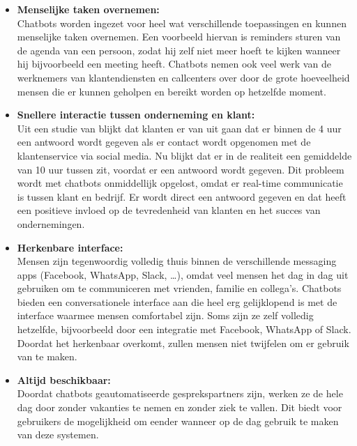 \begin{itemize}
    \item \textbf{Menselijke taken overnemen:} \\
    
    Chatbots worden ingezet voor heel wat verschillende toepassingen en kunnen menselijke taken overnemen. Een voorbeeld hiervan is reminders sturen van de agenda van een persoon, zodat hij zelf niet meer hoeft te kijken wanneer hij bijvoorbeeld een meeting heeft. Chatbots nemen ook veel werk van de werknemers van klantendiensten en callcenters over door de grote hoeveelheid mensen die er kunnen geholpen en bereikt worden op hetzelfde moment. \\
    
    \item \textbf{Snellere interactie tussen onderneming en klant:} \\
    
    Uit een studie van \textcite{Social2016} blijkt dat klanten er van uit gaan dat er binnen de 4 uur een antwoord wordt gegeven als er contact wordt opgenomen met de klantenservice via social media. Nu blijkt dat er in de realiteit een gemiddelde van 10 uur tussen zit, voordat er een antwoord wordt gegeven. Dit probleem wordt met chatbots onmiddellijk opgelost, omdat er real-time communicatie is tussen klant en bedrijf. Er wordt direct een antwoord gegeven en dat heeft een positieve invloed op de tevredenheid van klanten en het succes van ondernemingen. \\
    
    \item \textbf{Herkenbare interface:} \\
    
    Mensen zijn tegenwoordig volledig thuis binnen de verschillende messaging apps (Facebook, WhatsApp, Slack, …), omdat veel mensen het dag in dag uit gebruiken om te communiceren met vrienden, familie en collega’s. Chatbots bieden een conversationele interface aan die heel erg gelijklopend is met de interface waarmee mensen comfortabel zijn. Soms zijn ze zelf volledig hetzelfde, bijvoorbeeld door een integratie met Facebook, WhatsApp of Slack. Doordat het herkenbaar overkomt, zullen mensen niet twijfelen om er gebruik van te maken. \\
    
    \item \textbf{Altijd beschikbaar:} \\
    
    Doordat chatbots geautomatiseerde gesprekspartners zijn, werken ze de hele dag door zonder vakanties te nemen en zonder ziek te vallen. Dit biedt voor gebruikers de mogelijkheid om eender wanneer op de dag gebruik te maken van deze systemen. \\
    

\end{itemize}
